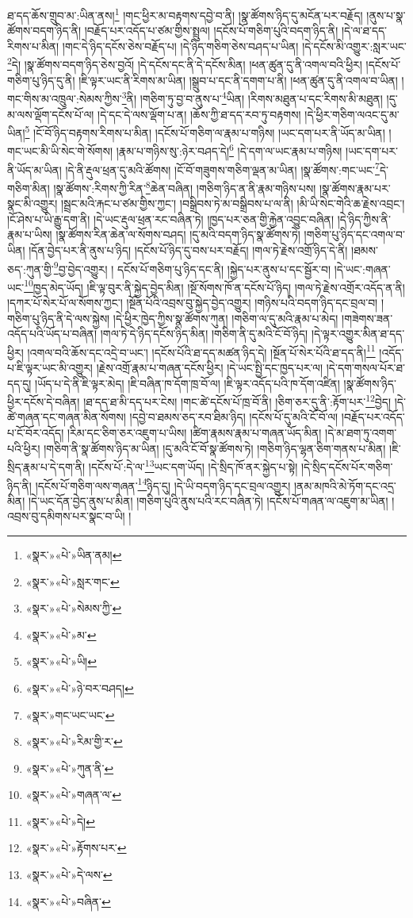 ཐ་དད་ཆོས་གྲུབ་མ་:ཡིན་ནས།\footnote{«སྣར་»«པེ་»ཡིན་ནམ།} །གང་ཕྱིར་མ་བརྟགས་དབྱེ་བ་ནི། །སྣ་ཚོགས་ཉིད་དུ་མངོན་པར་བརྗོད། །ནུས་པ་སྣ་ཚོགས་བདག་ཉིད་ནི། །བརྗོད་པར་འདོད་པ་ཙམ་གྱིས་སྤྲུལ། །དངོས་པོ་གཅིག་པུའི་བདག་ཉིད་ནི། །དེ་ལ་ཐ་དད་རིགས་པ་མིན། །གང་དེ་ཉིད་དངོས་ཅེས་བརྗོད་པ། །དེ་ཉིད་གཅིག་ཅེས་བཤད་པ་ཡིན། །དེ་དངོས་མི་འགྱུར་:སླར་ཡང་\footnote{«སྣར་»«པེ་»སླར་གང་}དེ། །སྣ་ཚོགས་བདག་ཉིད་ཅེས་བྱའོ། །དེ་དངོས་དང་ནི་དེ་དངོས་མིན། །ཕན་ཚུན་དུ་ནི་འགལ་བའི་ཕྱིར། །དངོས་པོ་གཅིག་པུ་ཉིད་དུ་ནི། །ཇི་ལྟར་ཡང་ནི་རིགས་མ་ཡིན། །སྒྲུབ་པ་དང་ནི་དགག་པ་ནི། །ཕན་ཚུན་དུ་ནི་འགལ་བ་ཡིན། །གང་གིས་མ་འཁྲུལ་:སེམས་ཀྱིས་\footnote{«སྣར་»«པེ་»སེམས་ཀྱི་}ནི། །གཅིག་ཏུ་བྱ་བ་ནུས་པ་\footnote{«སྣར་»«པེ་»མ་}ཡིན། །རིགས་མཐུན་པ་དང་རིགས་མི་མཐུན། །དུ་མ་ལས་ལྡོག་དངོས་པོ་ལ། །དེ་དང་དེ་ལས་ལྡོག་པ་ན། །ཆོས་ཀྱི་ཐ་དད་རབ་ཏུ་བརྟགས། །དེ་ཕྱིར་གཅིག་ལའང་དུ་མ་ཡིན།\footnote{«སྣར་»«པེ་»ཡི།} །ངོ་བོ་ཉིད་བརྟགས་རིགས་པ་མིན། །དངོས་པོ་གཅིག་ལ་རྣམ་པ་གཉིས། །ཡང་དག་པར་ནི་ཡོད་མ་ཡིན། །གང་ཡང་མི་ཡི་སེང་གེ་སོགས། །རྣམ་པ་གཉིས་སུ་:ཉེར་བཤད་དེ།\footnote{«སྣར་»«པེ་»ཉེ་བར་བཤད།} །དེ་དག་ལ་ཡང་རྣམ་པ་གཉིས། །ཡང་དག་པར་ནི་ཡོད་མ་ཡིན། །དེ་ནི་རྡུལ་ཕྲན་དུ་མའི་ཚོགས། །ངོ་བོ་གཟུགས་གཅིག་ལྡན་མ་ཡིན། །སྣ་ཚོགས་:གང་ཡང་\footnote{«སྣར་»གང་ཡང་ཡང་}དེ་གཅིག་མིན། །སྣ་ཚོགས་:རིགས་ཀྱི་རིན་\footnote{«སྣར་»«པེ་»རིམ་གྱི་ར་}ཆེན་བཞིན། །གཅིག་ཉིད་ན་ནི་རྣམ་གཉིས་པས། །སྣ་ཚོགས་རྣམ་པར་སྣང་མི་འགྱུར། །སྦྲང་མའི་རྐང་པ་ཙམ་གྱིས་ཀྱང་། །བསྒྲིབས་ཏེ་མ་བསྒྲིབས་པ་ལ་ནི། །མི་ཡི་སེང་གེའི་ཆ་རྗེས་འབྲང་། །ངོ་ཤེས་པ་ཡི་རྒྱུ་དག་ནི། །དེ་ཡང་རྡུལ་ཕྲན་རང་བཞིན་ཏེ། །ཁྱད་པར་ཅན་གྱི་རྐྱེན་འབྱུང་བཞིན། །དེ་ཉིད་ཀྱིས་ནི་རྣམ་པ་ཡིས། །སྣ་ཚོགས་རིན་ཆེན་ལ་སོགས་བཤད། །དུ་མའི་བདག་ཉིད་སྣ་ཚོགས་ཏེ། །གཅིག་པུ་ཉིད་དང་འགལ་བ་ཡིན། །དོན་བྱེད་པར་ནི་ནུས་པ་ཉིད། །དངོས་པོ་ཉིད་དུ་བས་པར་བརྗོད། །གལ་ཏེ་རྗེས་འགྲོ་ཉིད་དེ་ནི། །ཐམས་ཅད་:ཀུན་གྱི་\footnote{«སྣར་»«པེ་»ཀུན་ནི་}བྱ་བྱེད་འགྱུར། །
དངོས་པོ་གཅིག་པུ་ཉིད་དང་ནི། །སྐྱེད་པར་ནུས་པ་དང་སྦྱོར་བ། །དེ་ཡང་:གཞན་ཡང་\footnote{«སྣར་»«པེ་»གཞན་ལ་}ཁྱད་མེད་ཡོད། །ཇི་ལྟ་བུར་ནི་སྐྱེད་བྱེད་མིན། །སྔོ་སོགས་ཁོ་ན་དངོས་པོ་ཉིད། །གལ་ཏེ་རྗེས་འགྲོར་འདོད་ན་ནི། །དཀར་པོ་སེར་པོ་ལ་སོགས་ཀྱང་། །སྔོན་པོའི་འབྲས་བུ་སྐྱེད་བྱེད་འགྱུར། །གཉིས་པའི་བདག་ཉིད་དང་བྲལ་བ། །གཅིག་པུ་ཉིད་ནི་དེ་ལས་སྐྱེས། །དེ་ཕྱིར་ཁྱེད་ཀྱིས་སྣ་ཚོགས་ཀུན། །གཅིག་ལ་དུ་མའི་རྣམ་པ་མེད། །གཟེགས་ཟན་འདོད་པའི་ཡོད་པ་བཞིན། །གལ་ཏེ་དེ་ཉིད་དངོས་ཉིད་མིན། །གཅིག་ནི་དུ་མའི་ངོ་བོ་ཉིད། །དེ་ལྟར་འགྱུར་མིན་ཐ་དད་ཕྱིར། །འགལ་བའི་ཆོས་དང་འདྲེ་བ་ཡང་། །དངོས་པོའི་ཐ་དད་མཚན་ཉིད་དེ། །སྔོན་པོ་སེར་པོའི་ཐ་དད་ནི།\footnote{«སྣར་»«པེ་»དེ།} །འདོད་པ་ཇི་ལྟར་ཡང་མི་འགྱུར། །རྗེས་འགྲོ་རྣམ་པ་གཞན་དངོས་ཕྱིར། །དེ་ཡང་སྤྱི་དང་ཁྱད་པར་ལ། །དེ་དག་གསལ་པོར་ཐ་དད་དུ། །ཡོད་པ་དེ་ནི་ཇི་ལྟར་མེད། །ཇི་བཞིན་ཁ་དོག་ཁྲ་བོ་ལ། །ཇི་ལྟར་འདོད་པའི་ཁ་དོག་འཛིན། །སྣ་ཚོགས་ཉིད་ཕྱིར་དངོས་དེ་བཞིན། །ཐ་དད་ཐ་མི་དད་པར་ངེས། །གང་ཚེ་དངོས་པོ་ཁྲ་བོ་ནི། །ཅིག་ཅར་དུ་ནི་:རྟོག་པར་\footnote{«སྣར་»«པེ་»རྟོགས་པར་}བྱེད། །དེ་ཚེ་གཞན་དང་གཞན་མིན་སོགས། །དབྱེ་བ་ཐམས་ཅད་རབ་ཐིམ་ཉིད། །དངོས་པོ་དུ་མའི་ངོ་བོ་ལ། །བརྗོད་པར་འདོད་པ་ངོ་བོར་འདོད། །རིམ་དང་ཅིག་ཅར་འཇུག་པ་ཡིས། །ཚིག་རྣམས་རྣམ་པ་གཞན་ཡོད་མིན། །དེ་མ་ཐག་ཏུ་འགག་པའི་ཕྱིར། །གཅིག་ནི་སྣ་ཚོགས་ཉིད་མ་ཡིན། །དུ་མའི་ངོ་བོ་སྣ་ཚོགས་ཏེ། །གཅིག་ཉིད་ལྷན་ཅིག་གནས་པ་མིན། །ཇི་སྲིད་རྣམ་པ་དེ་དག་ནི། །དངོས་པོ་:དེ་ལ་\footnote{«སྣར་»«པེ་»དེ་ལས་}ཡང་དག་ཡོད། །དེ་སྲིད་ཁོ་ནར་སྐྱེད་པ་སྟེ། །དེ་སྲིད་དངོས་པོར་གཅིག་ཉིད་ནི། །དངོས་པོ་གཅིག་ལས་གཞན་\footnote{«སྣར་»«པེ་»བཞིན་}ཉིད་དུ། །དེ་ཡི་བདག་ཉིད་དང་བྲལ་འགྱུར། །ནམ་མཁའི་མེ་ཏོག་དང་འདྲ་མིན། །དེ་ཡང་དོན་བྱེད་ནུས་པ་མིན། །གཅིག་པུའི་ནུས་པའི་རང་བཞིན་ཏེ། །དངོས་པོ་གཞན་ལ་འཇུག་མ་ཡིན། །འབྲས་བུ་དམིགས་པར་སྣང་བ་ཡི། །
